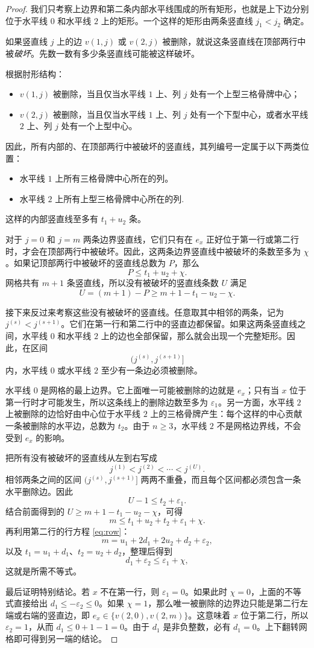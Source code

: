 \documentclass[11pt]{ctexart}
\theoremstyle{definition}
\begin{document}
\begin{proof}
我们只考察上边界和第二条内部水平线围成的所有矩形，也就是上下边分别位于水平线 $0$ 和水平线 $2$ 上的矩形。一个这样的矩形由两条竖直线 $j_1<j_2$ 确定。

如果竖直线 $j$ 上的边 $v(1,j)$ 或 $v(2,j)$ 被删除，就说这条竖直线在顶部两行中被\emph{破坏}。先数一数有多少条竖直线可能被这样破坏。

根据肘形结构：
\begin{itemize}
\item $v(1,j)$ 被删除，当且仅当水平线 $1$ 上、列 $j$ 处有一个上型三格骨牌中心；
\item $v(2,j)$ 被删除，当且仅当水平线 $1$ 上、列 $j$ 处有一个下型中心，或者水平线 $2$ 上、列 $j$ 处有一个上型中心。
\end{itemize}
因此，所有内部的、在顶部两行中被破坏的竖直线，其列编号一定属于以下两类位置：
\begin{itemize}
    \item 水平线 $1$ 上所有三格骨牌中心所在的列。
    \item 水平线 $2$ 上所有上型三格骨牌中心所在的列.
\end{itemize}

这样的内部竖直线至多有 $t_1+u_2$ 条。

对于 $j=0$ 和 $j=m$ 两条边界竖直线，它们只有在 $e_x$ 正好位于第一行或第二行时，才会在顶部两行中被破坏。因此，这两条边界竖直线中被破坏的条数至多为 $\chi$。如果记顶部两行中被破坏的竖直线总数为 $P$，那么
\[
P\le t_1+u_2+\chi.
\]
网格共有 $m+1$ 条竖直线，所以没有被破坏的竖直线条数 $U$ 满足
\[
U=(m+1)-P\ge m+1-t_1-u_2-\chi.
\]

接下来反过来考察这些没有被破坏的竖直线。任意取其中相邻的两条，记为 $j^{(s)}<j^{(s+1)}$。它们在第一行和第二行中的竖直边都保留。如果这两条竖直线之间，水平线 $0$ 和水平线 $2$ 上的边也全部保留，那么就会出现一个完整矩形。因此，在区间
\[
(j^{(s)},j^{(s+1)}]
\]
内，水平线 $0$ 或水平线 $2$ 至少有一条边必须被删除。

水平线 $0$ 是网格的最上边界。它上面唯一可能被删除的边就是 $e_x$；只有当 $x$ 位于第一行时才可能发生，所以这条线上的删除边数至多为 $\varepsilon_1$。另一方面，水平线 $2$ 上被删除的边恰好由中心位于水平线 $2$ 上的三格骨牌产生：每个这样的中心贡献一条被删除的水平边，总数为 $t_2$。由于 $n\ge3$，水平线 $2$ 不是网格边界线，不会受到 $e_x$ 的影响。

把所有没有被破坏的竖直线从左到右写成
\[
j^{(1)}<j^{(2)}<\cdots<j^{(U)}.
\]
相邻两条之间的区间 $(j^{(s)},j^{(s+1)}]$ 两两不重叠，而且每个区间都必须包含一条水平删除边。因此
\[
U-1\le t_2+\varepsilon_1.
\]
结合前面得到的
$U\ge m+1-t_1-u_2-\chi$，可得
\[
m\le t_1+u_2+t_2+\varepsilon_1+\chi.
\]
再利用第二行的行方程 \eqref{eq:row}：
\[
m=u_1+2d_1+2u_2+d_2+\varepsilon_2,
\]
以及 $t_1=u_1+d_1$、$t_2=u_2+d_2$，整理后得到
\[
d_1+\varepsilon_2\le\varepsilon_1+\chi,
\]
这就是所需不等式。

最后证明特别结论。若 $x$ 不在第一行，则 $\varepsilon_1=0$。如果此时 $\chi=0$，上面的不等式直接给出
$d_1\le-\varepsilon_2\le0$。如果 $\chi=1$，那么唯一被删除的边界边只能是第二行左端或右端的竖直边，即
$e_x\in\{v(2,0),v(2,m)\}$。这意味着 $x$ 位于第二行，所以 $\varepsilon_2=1$，从而
$d_1\le0+1-1=0$。由于 $d_1$ 是非负整数，必有 $d_1=0$。上下翻转网格即可得到另一端的结论。
\end{proof}
\end{document}
